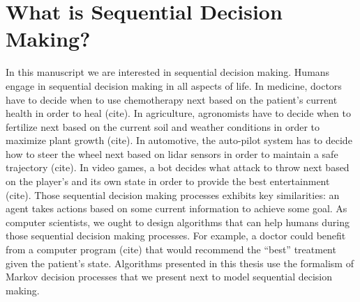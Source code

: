 \section{What is Sequential Decision Making?}
In this manuscript we are interested in sequential decision making. Humans engage in sequential decision making in all aspects of life. In medicine, doctors have to decide when to use chemotherapy next based on the patient's current health in order to heal (cite). In agriculture, agronomists have to decide when to fertilize next based on the current soil and weather conditions in order to maximize plant growth (cite). In automotive, the auto-pilot system has to decide how to steer the wheel next based on lidar sensors in order to maintain a safe trajectory (cite). In video games, a bot decides what attack to throw next based on the player's and its own state in order to provide the best entertainment (cite).
Those sequential decision making processes exhibits key similarities: an agent takes actions based on some current information to achieve some goal.
As computer scientists, we ought to design algorithms that can help humans during those sequential decision making processes. For example, a doctor could benefit from a computer program (cite) that would recommend the ``best'' treatment given the patient's state. 
Algorithms presented in this thesis use the formalism of Markov decision processes that we present next to model sequential decision making.
